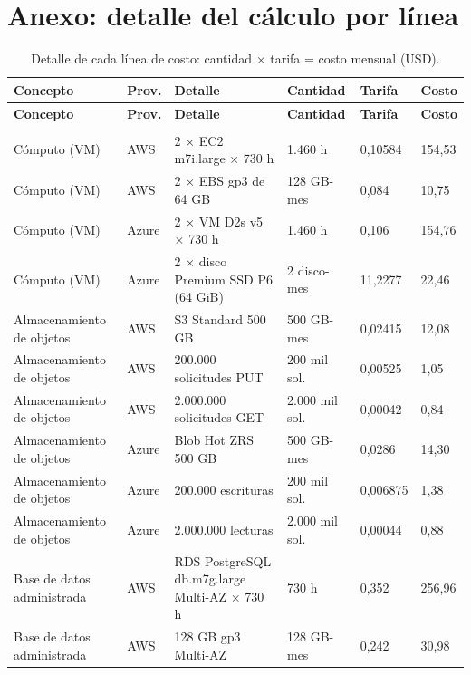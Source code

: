 \documentclass[11pt,letterpaper]{article}
\begin{document}
\section{Anexo: detalle del cálculo por línea}\label{anx:detalle}
\begingroup\footnotesize
\setlength{\LTcapwidth}{\linewidth}
\begin{longtable}{L{2.4cm}L{0.95cm}L{5.0cm}R{2.1cm}R{1.4cm}R{1.4cm}}
\caption{Detalle de cada línea de costo: cantidad × tarifa = costo mensual (USD).}\label{tab:detalle}\\
\toprule
\textbf{Concepto} & \textbf{Prov.} & \textbf{Detalle} & \textbf{Cantidad} & \textbf{Tarifa} & \textbf{Costo}\\
\endfirsthead
\toprule
\textbf{Concepto} & \textbf{Prov.} & \textbf{Detalle} & \textbf{Cantidad} & \textbf{Tarifa} & \textbf{Costo}\\
\endhead
\bottomrule
\endfoot
\midrule{}\\\midrule
Cómputo (VM) & AWS & 2 × EC2 m7i.large × 730 h & 1.460 h & 0,10584 & 154,53\\
Cómputo (VM) & AWS & 2 × EBS gp3 de 64 GB & 128 GB-mes & 0,084 & 10,75\\
Cómputo (VM) & Azure & 2 × VM D2s v5 × 730 h & 1.460 h & 0,106 & 154,76\\
Cómputo (VM) & Azure & 2 × disco Premium SSD P6 (64 GiB) & 2 disco-mes & 11,2277 & 22,46\\
Almacenamiento de objetos & AWS & S3 Standard 500 GB & 500 GB-mes & 0,02415 & 12,08\\
Almacenamiento de objetos & AWS & 200.000 solicitudes PUT & 200 mil sol. & 0,00525 & 1,05\\
Almacenamiento de objetos & AWS & 2.000.000 solicitudes GET & 2.000 mil sol. & 0,00042 & 0,84\\
Almacenamiento de objetos & Azure & Blob Hot ZRS 500 GB & 500 GB-mes & 0,0286 & 14,30\\
Almacenamiento de objetos & Azure & 200.000 escrituras & 200 mil sol. & 0,006875 & 1,38\\
Almacenamiento de objetos & Azure & 2.000.000 lecturas & 2.000 mil sol. & 0,00044 & 0,88\\
Base de datos administrada & AWS & RDS PostgreSQL db.m7g.large Multi-AZ × 730 h & 730 h & 0,352 & 256,96\\
Base de datos administrada & AWS & 128 GB gp3 Multi-AZ & 128 GB-mes & 0,242 & 30,98\\

\end{longtable}
\end{document}

